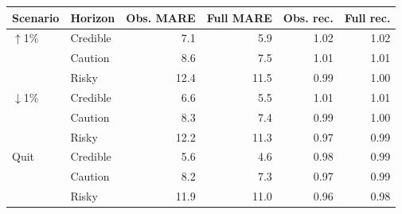 \begingroup
\renewcommand{\arraystretch}{1.08}
\setlength{\tabcolsep}{4pt}
\begin{tabular}{llrrrr}
\toprule
Scenario & Horizon & Obs. MARE & Full MARE & Obs. rec. & Full rec. \\
\midrule
$\uparrow$1\% & Credible & 7.1 & 5.9 & 1.02 & 1.02 \\
 & Caution & 8.6 & 7.5 & 1.01 & 1.01 \\
 & Risky & 12.4 & 11.5 & 0.99 & 1.00 \\
\midrule
$\downarrow$1\% & Credible & 6.6 & 5.5 & 1.01 & 1.01 \\
 & Caution & 8.3 & 7.4 & 0.99 & 1.00 \\
 & Risky & 12.2 & 11.3 & 0.97 & 0.99 \\
\midrule
Quit & Credible & 5.6 & 4.6 & 0.98 & 0.99 \\
 & Caution & 8.2 & 7.3 & 0.97 & 0.99 \\
 & Risky & 11.9 & 11.0 & 0.96 & 0.98 \\
\bottomrule
\end{tabular}
\endgroup
